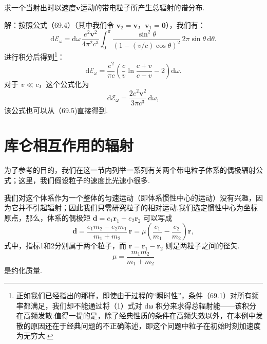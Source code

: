 \begin{xiti}

\quad 求一个当射出时以速度$\boldsymbol{v}$运动的带电粒子所产生总辐射的谱分布.

解：按照公式（69.4）（其中我们令 $\boldsymbol{v}_2=\boldsymbol{v}$，$\boldsymbol{v}_1=\boldsymbol{0}$），我们有：
\begin{equation*}
  \mathrm{d}\mathcal{E}_\omega=\mathrm{d}\omega\,\frac{e^2\boldsymbol{v}^2}{4\pi^2c^3}\int_0^{\pi}\frac{\sin^2\theta}{(1-(v/c)\cos\theta)^2}\,2\pi\sin\theta\,\mathrm{d}\theta.
\end{equation*}
进行积分后得到\footnote{正如我们已经指出的那样，即使由于过程的“瞬时性”，条件（69.1）对所有频率都满足，我们却不能通过将（1）式对 dω 积分来求得总辐射能——该积分在高频发散.值得一提的是，除了经典性质的条件在高频失效以外，在本例中发散的原因还在于经典问题的不正确陈述，即这个问题中粒子在初始时刻加速度为无穷大.}：
\begin{equation*}
  \mathrm{d}\mathcal{E}_\omega=\frac{e^2}{\pi c}\left(\frac{c}{v}\ln\frac{c+v}{c-v}-2\right)\mathrm{d}\omega.\tag{1}
\end{equation*}
对于 $v\ll c$，这个公式化为
\begin{equation*}
  \mathrm{d}\mathcal{E}_\omega=\frac{2e^2\boldsymbol{v}^2}{3\pi c^3}\,\mathrm{d}\omega,
\end{equation*}
该公式也可以从（69.5)直接得到.

\end{xiti}

\section{库仑相互作用的辐射}

为了参考的目的，我们在这一节内列举一系列有关两个带电粒子体系的偶极辐射公式；这里，我们假设粒子的速度比光速小很多.

我们对这个体系作为一个整体的匀速运动（即体系惯性中心的运动）没有兴趣，因为它并不引起辐射；因此我们只需研究粒子的相对运动.我们选定惯性中心为坐标原点，那么，体系的偶极矩 $\boldsymbol{d}=e_1\boldsymbol{r}_1+e_2\boldsymbol{r}_2$ 可以写成
\begin{equation}
  \boldsymbol{d}=\frac{e_1m_2-e_2m_1}{m_1+m_2}\,\boldsymbol{r}
  =\mu\left(\frac{e_1}{m_1}-\frac{e_2}{m_2}\right)\boldsymbol{r},
\end{equation}
式中，指标1和2分别属于两个粒子，而 $\boldsymbol{r}=\boldsymbol{r}_1-\boldsymbol{r}_2$ 则是两粒子之间的径矢.
\begin{equation*}
  \mu=\frac{m_1m_2}{m_1+m_2}
\end{equation*}
是约化质量.

